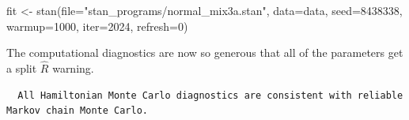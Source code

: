 \documentclass[
  letterpaper,
  DIV=11,
  numbers=noendperiod]{scrartcl}
\newenvironment{Shaded}{\begin{snugshade}}{\end{snugshade}}
\newcommand{\AttributeTok}[1]{\textcolor[rgb]{0.40,0.45,0.13}{#1}}
\newcommand{\ConstantTok}[1]{\textcolor[rgb]{0.56,0.35,0.01}{#1}}
\newcommand{\DecValTok}[1]{\textcolor[rgb]{0.68,0.00,0.00}{#1}}
\newcommand{\FunctionTok}[1]{\textcolor[rgb]{0.28,0.35,0.67}{#1}}
\newcommand{\NormalTok}[1]{\textcolor[rgb]{0.00,0.23,0.31}{#1}}
\newcommand{\OtherTok}[1]{\textcolor[rgb]{0.00,0.23,0.31}{#1}}
\newcommand{\SpecialCharTok}[1]{\textcolor[rgb]{0.37,0.37,0.37}{#1}}
\newcommand{\StringTok}[1]{\textcolor[rgb]{0.13,0.47,0.30}{#1}}
\begin{document}
\begin{Shaded}
\begin{Highlighting}[]
\NormalTok{fit }\OtherTok{\textless{}{-}} \FunctionTok{stan}\NormalTok{(}\AttributeTok{file=}\StringTok{"stan\_programs/normal\_mix3a.stan"}\NormalTok{,}
            \AttributeTok{data=}\NormalTok{data, }\AttributeTok{seed=}\DecValTok{8438338}\NormalTok{,}
            \AttributeTok{warmup=}\DecValTok{1000}\NormalTok{, }\AttributeTok{iter=}\DecValTok{2024}\NormalTok{, }\AttributeTok{refresh=}\DecValTok{0}\NormalTok{)}
\end{Highlighting}
\end{Shaded}

The computational diagnostics are now so generous that all of the
parameters get a split \(\hat{R}\) warning.

\begin{Shaded}
\end{Shaded}

\begin{verbatim}
  All Hamiltonian Monte Carlo diagnostics are consistent with reliable
Markov chain Monte Carlo.
\end{verbatim}

\begin{Shaded}
\end{Shaded}
\end{document}
